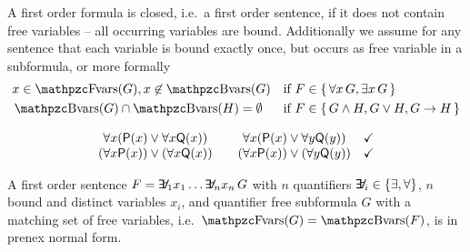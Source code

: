 \begin{definition}\label{def:fof:closed}\label{def:fof:sentence}
	A first order formula is closed, i.e.~a first order {\myem sentence}, 
	if it does not contain free variables -- all occurring variables are bound.
	Additionally we assume for any sentence 
	that each variable is bound exactly once, 
	but occurs as free variable in a subformula, 
	or more formally
	\begin{align*}
	&x\in\fvar(G), x\not\in\bvar(G)& \text{if }&F \in\{\, \forall x\,G, \exists x\,G\,\}
	 \\
	&\bvar(G)\cap\bvar(H)=\emptyset& \text{if }&F \in\{\,G\land H,G\lor H,G\limp H\,\}
	\end{align*}
\end{definition}

\begin{example}
	\[
	\begin{array}{clcl}
		\forall x ({{\mathsf P}(x) \lor \forall x {{\mathsf Q}(x)}}) && \forall x ({{\mathsf P}(x) \lor \forall y {{\mathsf Q}(y)}}) &  \checkmark\\
		(\forall x {{\mathsf P}(x)}) \lor (\forall x {{\mathsf Q}(x)}) & & (\forall x {{\mathsf P}(x)}) \lor (\forall y {{\mathsf Q}(y)}) & \checkmark
	\end{array}
	\]
	
\end{example}

\begin{definition}[\PNF]
	A first order sentence $F = \quantify_1 x_1 \ldots \quantify_n x_n\, G$ 
	with $n$ quantifiers $\quantify_i \in \{\exists,\forall\}$,
	$n$ bound and distinct variables $x_i$, 
	and quantifier free subformula $G$ with 
	a matching set of free variables, i.e.~$\fvar(G) = \bvar(F)$,
	is in {\myem prenex normal form}.
\end{definition}


